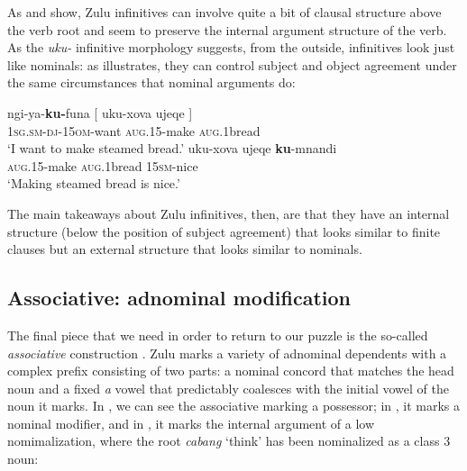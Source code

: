 \documentclass[output=paper,colorlinks,citecolor=brown]{langscibook}
\begin{document}
As  and  show, Zulu infinitives can involve quite a bit of clausal structure above the verb root and seem to preserve the internal argument structure of the verb. As the \textit{uku-} infinitive morphology suggests, from the outside, infinitives look just like nominals: as  illustrates, they can control subject and object agreement under the same circumstances that nominal arguments do:


\ea%
    \label{ex:halpert:9}
    \ea%
    \label{ex:halpert:9a}
    \gll    ngi-ya-\textbf{ku-}funa [ uku-xova ujeqe ]\\
            1\textsc{sg}.\textsc{sm}-\textsc{dj}-15\textsc{om}-want {} \textsc{aug}.15-make \textsc{aug}.1bread\\
    \glt    `I want to make steamed bread.'
    \ex%
    \label{ex:halpert:9b}
    \gll    uku-xova ujeqe \textbf{ku}-mnandi\\
            \textsc{aug}.15-make \textsc{aug}.1bread 15\textsc{sm}-nice\\
    \glt    `Making steamed bread is nice.'
    \z 
\z 

The main takeaways about Zulu infinitives, then, are that they have an internal structure (below the position of subject agreement) that looks similar to finite clauses but an external structure that looks similar to nominals.

\subsection{Associative: adnominal modification}\label{sec:halpert:2.3}

The final piece that we need in order to return to our puzzle is the so-called \textit{associative} construction \citep{Sabelo1990,Halpert2015,Jones2018}. Zulu marks a variety of adnominal dependents with a complex prefix consisting of two parts: a nominal concord that matches the head noun and a fixed \textit{a} vowel that predictably coalesces with the initial vowel of the noun it marks.  In , we can see the associative marking a possessor; in , it marks a nominal modifier, and in , it marks the internal argument of a low nomimalization, where the root \textit{cabang} `think' has been nominalized as a class 3 noun:
\end{document}

